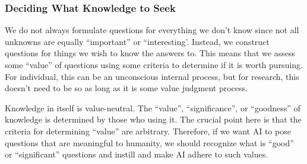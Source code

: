 

\subsubsection{Deciding What Knowledge to Seek}
\label{section-deciding-what-knowledge-to-seek}
We do not always formulate questions for everything we don't know since not all unknowns are equally ``important'' or ``interesting'. Instead, we construct questions for things we wish to know the answers to. This means that we assess some ``value'' of questions using some criteria to determine if it is worth pursuing. For individual, this can be an unconscious internal process, but for research, this doesn't need to be so as long as it is some value judgment process.

Knowledge in itself is value-neutral. The ``value'', ``significance'', or ``goodness'' of knowledge is determined by those who using it. The crucial point here is that the criteria for determining ``value'' are arbitrary. Therefore, if we want AI to pose questions that are meaningful to humanity, we should recognize what is ``good'' or ``significant'' questions and instill and make AI adhere to such values. 

